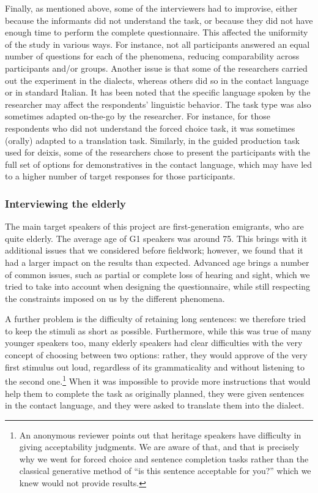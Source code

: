 \documentclass[output=paper,hidelinks]{langscibook}
\begin{document}
Finally, as mentioned above, some of the interviewers had to improvise, either because the informants did not understand the task, or because they did not have enough time to perform the complete questionnaire. This affected the uniformity of the study in various ways. For instance, not all participants answered an equal number of questions for each of the phenomena, reducing comparability across participants and/or groups. Another issue is that some of the researchers carried out the experiment in the dialects, whereas others did so in the contact language or in standard Italian. It has been noted \citep{AalberseMuysken2013} that the specific language spoken by the researcher may affect the respondents’ linguistic behavior. The task type was also sometimes adapted on-the-go by the researcher. For instance, for those respondents who did not understand the forced choice task, it was sometimes (orally) adapted to a translation task. Similarly, in the guided production task used for deixis, some of the researchers chose to present the participants with the full set of options for demonstratives in the contact language, which may have led to a higher number of target responses for those participants. 

\subsubsection{Interviewing the elderly}\label{sec:andrani:3.3.1}

The main target speakers of this project are first-generation emigrants, who are quite elderly. The average age of G1 speakers was around 75. This brings with it additional issues that we considered before fieldwork; however, we found that it had a larger impact on the results than expected. Advanced age brings a number of common issues, such as partial or complete loss of hearing and sight, which we tried to take into account when designing the questionnaire, while still respecting the constraints imposed on us by the different phenomena. 

A further problem is the difficulty of retaining long sentences: we therefore tried to keep the stimuli as short as possible. Furthermore, while this was true of many younger speakers too, many elderly speakers had clear difficulties with the very concept of choosing between two options: rather, they would approve of the very first stimulus out loud, regardless of its grammaticality and without listening to the second one.\footnote{An anonymous reviewer points out that heritage speakers have difficulty in giving acceptability judgments. We are aware of that, and that is precisely why we went for forced choice and sentence completion tasks rather than the classical generative method of ``is this sentence acceptable for you?'' which we knew would not provide results.} When it was impossible to provide more instructions that would help them to complete the task as originally planned, they were given sentences in the contact language, and they were asked to translate them into the dialect.
\end{document}
